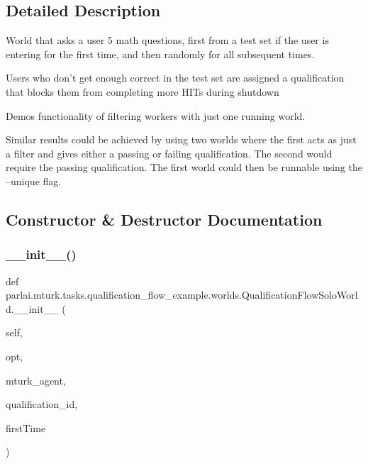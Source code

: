 \subsection{Detailed Description}
\begin{DoxyVerb}World that asks a user 5 math questions, first from a test set if the user is
entering for the first time, and then randomly for all subsequent times.

Users who don't get enough correct in the test set are assigned a
qualification that blocks them from completing more HITs during shutdown

Demos functionality of filtering workers with just one running world.

Similar results could be achieved by using two worlds where the first acts
as just a filter and gives either a passing or failing qualification. The
second would require the passing qualification. The first world could then
be runnable using the --unique flag.
\end{DoxyVerb}
 

\subsection{Constructor \& Destructor Documentation}
\mbox{\label{classparlai_1_1mturk_1_1tasks_1_1qualification__flow__example_1_1worlds_1_1QualificationFlowSoloWorld_a3d703ff5db42f79baaec3cd6e601edaf}} 
\subsubsection{\texorpdfstring{\+\_\+\+\_\+init\+\_\+\+\_\+()}{\_\_init\_\_()}}
{\footnotesize\ttfamily def parlai.\+mturk.\+tasks.\+qualification\+\_\+flow\+\_\+example.\+worlds.\+Qualification\+Flow\+Solo\+World.\+\_\+\+\_\+init\+\_\+\+\_\+ (\begin{DoxyParamCaption}\item[{}]{self,  }\item[{}]{opt,  }\item[{}]{mturk\+\_\+agent,  }\item[{}]{qualification\+\_\+id,  }\item[{}]{first\+Time }\end{DoxyParamCaption})}




